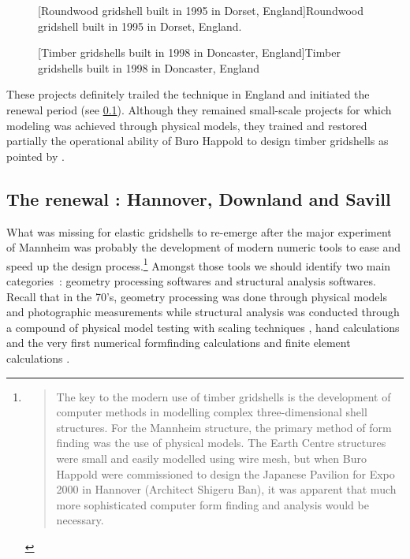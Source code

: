 \begin{figure}[t]
		\hspace*{\fill}
		\vspace{10pt}
		[Roundwood gridshell built in 1995 in Dorset, England]{Roundwood gridshell built in 1995 in Dorset, England.}
		\label{fig:dorset}    
\end{figure}
\begin{figure}[h]
		\hspace*{\fill}
		\vspace{10pt}
		[Timber gridshells built in 1998 in Doncaster, England]{Timber gridshells built in 1998 in Doncaster, England}
		\label{fig:doncaster}    
\end{figure}

These projects definitely trailed the technique in England and initiated the renewal period (see \cref{sec:renewal}). Although they remained small-scale projects for which modeling was achieved through physical models, they trained and restored partially the operational ability of Buro Happold to design timber gridshells as pointed by \citet{Harris2003}.

\subsection{The renewal : Hannover, Downland and Savill}
\label{sec:renewal}

What was missing for elastic gridshells to re-emerge after the major experiment of Mannheim was probably the development of modern numeric tools to ease and speed up the design process.\footnote{\blockcquote[]{Harris2003}{The key to the modern use of timber gridshells is the development of computer methods in modelling complex three-dimensional shell structures. For the Mannheim structure, the primary method of form finding was the use of physical models. The Earth Centre structures were small and easily modelled using wire mesh, but when Buro Happold were commissioned to design the Japanese Pavilion for Expo 2000 in Hannover (Architect Shigeru Ban), it was apparent that much more sophisticated computer form finding and analysis would be necessary.}} Amongst those tools we should identify two main categories~: geometry processing softwares and structural analysis softwares. Recall that in the 70's, geometry processing was done through physical models and photographic measurements \cite[pp.~130-135]{IL10} while structural analysis was conducted through a compound of physical model testing with scaling techniques \cite[pp.~130-135]{IL13}, hand calculations and the very first numerical formfinding calculations \cite[pp.~184-193]{IL10} and finite element calculations \cite[pp.~210-217]{IL10}.


